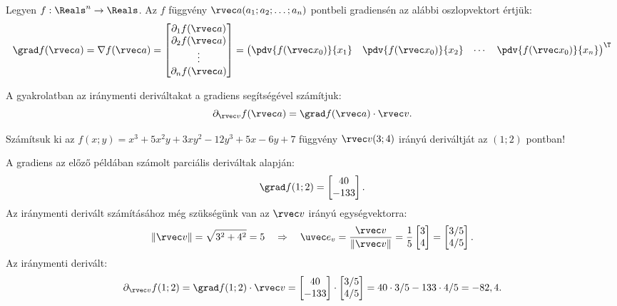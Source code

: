 \begin{definition}[Gradiens]
  Legyen $f: \Reals^n \to \Reals$. Az $f$ függvény
  $\rvec a(a_{1}; a_{2}; \ldots; a_{n})$ pontbeli gradiensén az alábbi
  oszlopvektort értjük:
  \def\arraystretch{1.5}
  $$
    \grad f(\rvec a) = \nabla f(\rvec a) = \begin{bmatrix}
      \partial_1 f(\rvec a) \\
      \partial_2 f(\rvec a) \\
      \vdots                \\
      \partial_n f(\rvec a)
    \end{bmatrix} = \begin{pmatrix}
      \displaystyle\pdv{f(\rvec x_0)}{x_1} &
      \displaystyle\pdv{f(\rvec x_0)}{x_2} &
      \cdots                               &
      \displaystyle\pdv{f(\rvec x_0)}{x_n}
    \end{pmatrix}^\T
  $$
\end{definition}

\begin{note}
  A gyakrolatban az iránymenti deriváltakat a gradiens segítségével számítjuk:
  $$
    \partial_{\rvec v} f(\rvec a) = \grad f(\rvec a) \cdot \rvec v
    \text.
  $$
\end{note}

\begin{example}
  Számítsuk ki az $f(x; y) = x^3 + 5x^2y + 3xy^2 - 12y^3 + 5x - 6y + 7$
  függvény $\rvec v(3;4)$ irányú deriváltját az $(1;2)$ pontban!

  \hdashrule[.8ex][x]{\dimexpr\textwidth}{1pt}{2mm 3pt}

  A gradiens az előző példában számolt parciális deriváltak alapján:
  $$
    \grad f(1;2) = \begin{bmatrix}
      40 \\ -133
    \end{bmatrix}
    \text.
  $$
  Az iránymenti derivált számításához még szükségünk van az $\rvec v$ irányú
  egységvektorra:
  $$
    \|\rvec v\| = \sqrt{3^2 + 4^2} = 5
    \quad\Rightarrow\quad
    \uvec e_v = \frac{\rvec v}{\|\rvec v\|} = \frac{1}{5} \begin{bmatrix}
      3 \\ 4
    \end{bmatrix} = \begin{bmatrix}
      3/5 \\ 4/5
    \end{bmatrix}
    \text.
  $$
  Az iránymenti derivált:
  $$
    \partial_{\rvec v} f(1;2) = \grad f(1;2) \cdot \rvec v = \begin{bmatrix}
      40 \\ -133
    \end{bmatrix} \cdot \begin{bmatrix}
      3/5 \\ 4/5
    \end{bmatrix} = 40 \cdot 3/5 - 133 \cdot 4/5 = -82,4
    \text.
  $$
\end{example}


